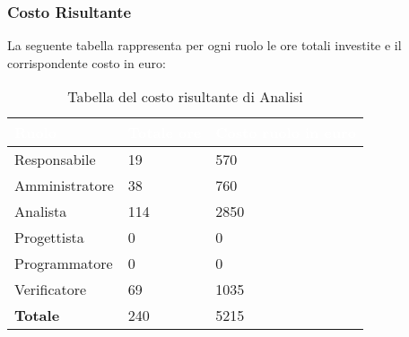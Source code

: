 \subsubsection{Costo Risultante}
La seguente tabella rappresenta per ogni ruolo le ore totali investite e il corrispondente costo in euro:
{
\renewcommand{\arraystretch}{2}
\centering

\begin{longtable}{ C{3cm} C{2cm} C{4cm}}
\caption{Tabella del costo risultante di Analisi}\\
	\textcolor{white}{\textbf{Ruolo}} & 
	\textcolor{white}{\textbf{Totale ore}} & 
	\textcolor{white}{\textbf{Costo ruolo in euro}}\\	
\endhead

        Responsabile & 19 & 570\\
        Amministratore & 38 & 760\\
        Analista & 114 & 2850 \\
        Progettista & 0 & 0 \\
        Programmatore & 0 & 0 \\
        Verificatore & 69 & 1035 \\
        \textbf{Totale} & 240 & 5215 \\
		
	\end{longtable}

}




\clearpage


\clearpage


\clearpage


\clearpage
